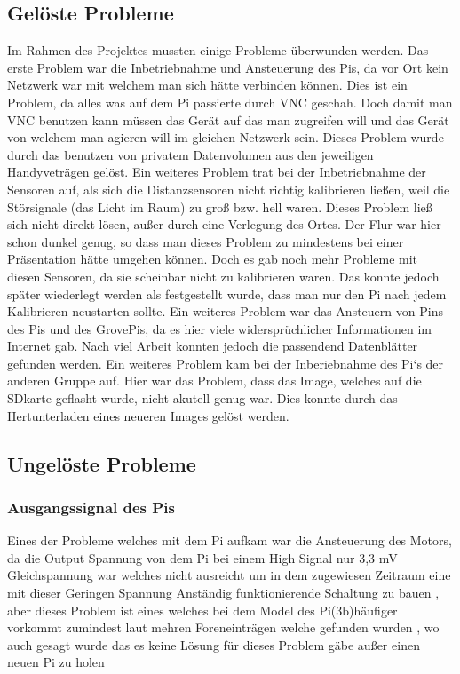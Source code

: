 \documentclass[notitlepage]{report}
\begin{document}
\subsection{Gel\"{o}ste Probleme}

Im Rahmen des Projektes mussten einige Probleme \"{u}berwunden werden. Das erste Problem war die Inbetriebnahme und Ansteuerung des Pis, da vor Ort kein Netzwerk war mit welchem man sich h\"{a}tte verbinden k\"{o}nnen. Dies ist ein Problem, da alles was auf dem Pi passierte durch VNC geschah. Doch damit man VNC benutzen kann m\"{u}ssen das Ger\"{a}t auf das man zugreifen will und das Ger\"{a}t von welchem man agieren will im gleichen Netzwerk sein. Dieses Problem wurde durch das benutzen von privatem Datenvolumen aus den jeweiligen Handyvetr\"{a}gen gel\"{o}st. Ein weiteres Problem trat bei der Inbetriebnahme der Sensoren auf, als sich die Distanzsensoren nicht richtig kalibrieren lie{\ss}en, weil die St\"{o}rsignale (das Licht im Raum) zu gro{\ss} bzw. hell waren. Dieses Problem lie{\ss} sich nicht direkt l\"{o}sen, au{\ss}er durch eine Verlegung des Ortes. Der Flur war hier schon dunkel genug, so dass man dieses Problem zu mindestens bei einer Pr\"{a}sentation h\"{a}tte umgehen k\"{o}nnen. Doch es gab noch mehr Probleme mit diesen Sensoren, da sie scheinbar nicht zu kalibrieren waren. Das konnte jedoch sp\"{a}ter wiederlegt werden als festgestellt wurde, dass man nur den Pi nach jedem Kalibrieren neustarten sollte. Ein weiteres Problem war das Ansteuern von Pins des Pis und des GrovePis, da es hier viele widerspr\"{u}chlicher Informationen im Internet gab. Nach viel Arbeit konnten jedoch die passendend Datenbl\"{a}tter gefunden werden. Ein weiteres Problem kam bei der Inberiebnahme des Pi`s der anderen Gruppe auf. Hier war das Problem, dass das Image, welches auf die SDkarte geflasht wurde, nicht akutell genug war. Dies konnte durch das Hertunterladen eines neueren Images gel\"{o}st werden.

\subsection{Ungel\"{o}ste Probleme}

\subsubsection{Ausgangssignal des Pis}

Eines der Probleme welches mit dem Pi aufkam war die Ansteuerung des Motors, da die Output Spannung von dem Pi bei einem High Signal nur 3,3 mV Gleichspannung war welches nicht ausreicht um in dem zugewiesen Zeitraum eine mit dieser Geringen Spannung Anst\"{a}ndig funktionierende Schaltung zu bauen , aber dieses Problem ist eines welches bei dem Model des Pi(3b)h\"{a}ufiger vorkommt zumindest laut mehren Foreneintr\"{a}gen welche  gefunden wurden , wo auch gesagt wurde das es keine L\"{o}sung f\"{u}r dieses Problem g\"{a}be au{\ss}er einen neuen Pi zu holen 
\end{document}
